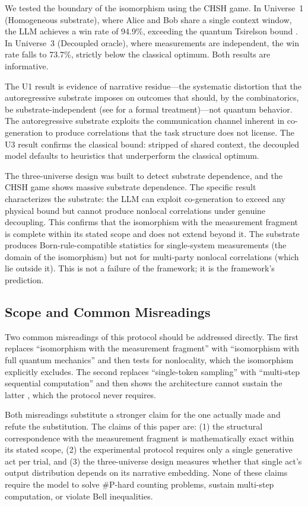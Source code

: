 \documentclass[12pt,a4paper]{article}
\begin{document}
We tested the boundary of the isomorphism using the CHSH game. In Universe~1 (Homogeneous substrate), where Alice and Bob share a single context window, the LLM achieves a win rate of 94.9\%, exceeding the quantum Tsirelson bound \citep{aaronson2026}. In Universe~3 (Decoupled oracle), where measurements are independent, the win rate falls to 73.7\%, strictly below the classical optimum. Both results are informative.

The U1 result is evidence of narrative residue---the systematic distortion that the autoregressive substrate imposes on outcomes that should, by the combinatorics, be substrate-independent (see \citealt{baldo2026} for a formal treatment)---not quantum behavior. The autoregressive substrate exploits the communication channel inherent in co-generation to produce correlations that the task structure does not license. The U3 result confirms the classical bound: stripped of shared context, the decoupled model defaults to heuristics that underperform the classical optimum.

The three-universe design was built to detect substrate dependence, and the CHSH game shows massive substrate dependence. The specific result characterizes the substrate: the LLM can exploit co-generation to exceed any physical bound but cannot produce nonlocal correlations under genuine decoupling. This confirms that the isomorphism with the measurement fragment is complete within its stated scope and does not extend beyond it. The substrate produces Born-rule-compatible statistics for single-system measurements (the domain of the isomorphism) but not for multi-party nonlocal correlations (which lie outside it). This is not a failure of the framework; it is the framework's prediction.

\subsection{Scope and Common Misreadings}
\label{sec:scope_misreadings}

Two common misreadings of this protocol should be addressed directly. The first replaces ``isomorphism with the measurement fragment'' with ``isomorphism with full quantum mechanics'' and then tests for nonlocality, which the isomorphism explicitly excludes. The second replaces ``single-token sampling'' with ``multi-step sequential computation'' and then shows the architecture cannot sustain the latter \citep{merrill2023}, which the protocol never requires.

Both misreadings substitute a stronger claim for the one actually made and refute the substitution. The claims of this paper are: (1) the structural correspondence with the measurement fragment is mathematically exact within its stated scope, (2) the experimental protocol requires only a single generative act per trial, and (3) the three-universe design measures whether that single act's output distribution depends on its narrative embedding. None of these claims require the model to solve \#P-hard counting problems, sustain multi-step computation, or violate Bell inequalities.
\end{document}
